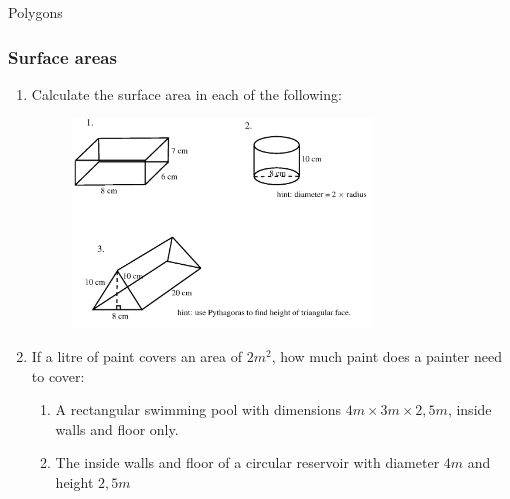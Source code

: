\begin{exercises}{Polygons}
            \subsubsection{  Surface areas }
            \nopagebreak
            
        \label{m39357*id62786}\begin{enumerate}[noitemsep, label=\textbf{\arabic*}. ] 
            \label{m39357*uid12}\item Calculate the surface area in each of the following:

    \setcounter{subfigure}{0}


	\begin{figure}[H] %
    \begin{center}
    \label{m39357*id62804!!!underscore!!!media}\label{m39357*id62804!!!underscore!!!printimage}\includegraphics[width=300px]{col11306.imgs/m39357_MG10C14_003.png} %
        
      \vspace{2pt}
    \vspace{.1in}
    
    \end{center}

 \end{figure}   

    \addtocounter{footnote}{-0}
            \label{m39357*uid13}\item  If a litre of paint covers an area of $2{m}^{2}$, how much paint does a painter need to cover:
\label{m39357*id62841}\begin{enumerate}[noitemsep, label=\textbf{\alph*}. ] 
            \label{m39357*uid14}\item A rectangular swimming pool with dimensions $4m\ensuremath{\times}3m\ensuremath{\times}2,5m$, inside walls and floor only.
\label{m39357*uid15}\item The inside walls and floor
of a circular reservoir with diameter $4m$ and height $2,5m$\end{enumerate}
        

\end{enumerate}
\end{exercises}
